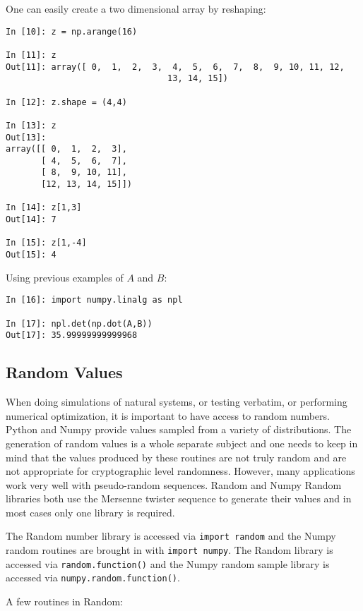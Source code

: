 One can easily create a two dimensional array by reshaping:

\begin{verbatim}
In [10]: z = np.arange(16)

In [11]: z
Out[11]: array([ 0,  1,  2,  3,  4,  5,  6,  7,  8,  9, 10, 11, 12,
                                13, 14, 15])

In [12]: z.shape = (4,4)

In [13]: z
Out[13]:
array([[ 0,  1,  2,  3],
       [ 4,  5,  6,  7],
       [ 8,  9, 10, 11],
       [12, 13, 14, 15]])

In [14]: z[1,3]
Out[14]: 7

In [15]: z[1,-4]
Out[15]: 4
\end{verbatim}

Using previous examples of \(A\) and \(B\):

\begin{verbatim}
In [16]: import numpy.linalg as npl

In [17]: npl.det(np.dot(A,B))
Out[17]: 35.99999999999968
\end{verbatim}

\hypertarget{random-values}{%
\subsection{Random Values}\label{random-values}}

When doing simulations of natural systems, or testing verbatim, or
performing numerical optimization, it is important to have access to
random numbers. Python and Numpy provide values sampled from a variety
of distributions. The generation of random values is a whole separate
subject and one needs to keep in mind that the values produced by these
routines are not truly random and are not appropriate for cryptographic
level randomness. However, many applications work very well with
pseudo-random sequences. Random and Numpy Random libraries both use the
Mersenne twister sequence to generate their values and in most cases
only one library is required.

The Random number library is accessed via \texttt{import\ random} and
the Numpy random routines are brought in with \texttt{import\ numpy}.
The Random library is accessed via \texttt{random.function()} and the
Numpy random sample library is accessed via
\texttt{numpy.random.function()}.

A few routines in Random:

